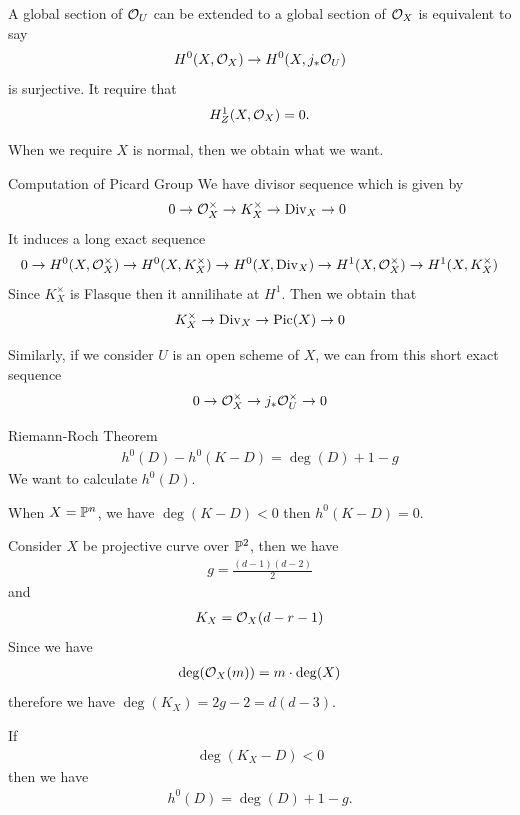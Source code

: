 {A global section of $\o_U$ can be extended to a global section of $\o_X$ is equivalent to say 
\begin{align*}
    H^0(X,\o_X) \to H^0(X,j_*\o_U)
\end{align*}
is surjective.
It require that 
\begin{align*}
    H^1_Z(X,\o_X) = 0.
\end{align*}

When we require $X$ is normal, then we obtain what we want.

\np Computation of Picard Group
We have divisor sequence which is given by 
\begin{align*}
    0 \to \o_X^\times\to K_X^\times \to\div_X \to 0\
\end{align*}
It induces a long exact sequence 
\begin{align*}
    0 \to H^0(X,\o_X^\times) \to H^0(X,K_X^\times) \to H^0(X,\div_X)\to H^1(X,\o_X^\times) \to H^1(X,K_X^\times)
\end{align*}
Since $K_X^\times$ is Flasque then it annilihate at $H^1$. Then we obtain that 
\begin{align*}
    K_X^\times \to \div_X \to \pic(X) \to 0 
\end{align*}

Similarly, if we consider $U$ is an open scheme of $X$, we can from this short exact sequence 
\begin{align*}
    0\to \o_X^\times \to j_*\o_U^\times \to 0
\end{align*}

\np Riemann-Roch Theorem 
\begin{align*}
    h^0(D)-h^0(K-D) = \deg(D)+1-g
\end{align*}
We want to calculate $h^0(D)$.



When $X=\P^n$, we have $\deg(K-D)<0$ then $h^0(K-D)=0$.

Consider $X$ be projective curve over $\P^2$, then we have 
\begin{align*}
    g= \frac{(d-1)(d-2)}{2}
\end{align*}
and 
\begin{align*}
    K_X = \o_X(d-r-1) 
\end{align*}
Since we have 
\begin{align*}
    \deg(\o_X(m)) = m\cdot \deg(X)
\end{align*}
therefore we have $\deg(K_X) = 2g-2= d(d-3)$.

If 
\begin{align*}
    \deg(K_X-D)<0
\end{align*}
then we have 
\begin{align*}
    h^0(D) = \deg(D)+1-g.
\end{align*}


}
